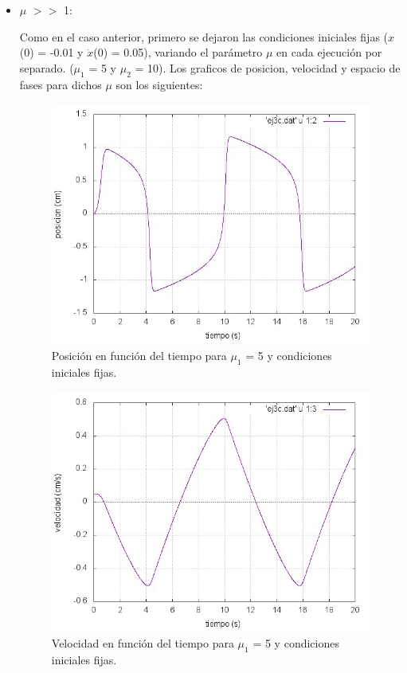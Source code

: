 \documentclass[a4paper,12pt]{article}
\begin{document}
\begin{itemize}
\item $\mu$ $>>$ 1:


Como en el caso anterior, primero se dejaron las condiciones iniciales fijas ($x$(0) = -0.01 y $\dot{x}$(0) = 0.05), variando el par\'ametro $\mu$ en cada ejecuci\'on por separado. ($\mu_1$ = 5 y $\mu_2$ = 10). Los graficos de posicion, velocidad y espacio de fases para dichos $\mu$ son los siguientes:

\begin{figure}[H]
\begin{center}
\includegraphics[height=8cm]{grafico_ej3c_xVSt.jpg}
\caption[width=5cm]{Posici\'on en funci\'on del tiempo para $\mu_1$ = 5 y condiciones iniciales fijas.}
\end{center}
\end{figure}

\begin{figure}[H]
\begin{center}
\includegraphics[height=8cm]{grafico_ej3c_vVSt.jpg}
\caption[width=5cm]{Velocidad en funci\'on del tiempo para $\mu_1$ = 5 y condiciones iniciales fijas.}
\end{center}
\end{figure}


\end{itemize}
\end{document}

